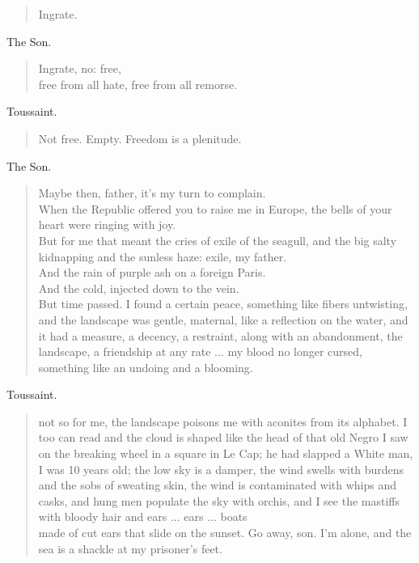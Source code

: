 \documentclass[letterpaper,article,12pt,oneside,notitlepage]{memoir}
\begin{document}
\begin{verse}
Ingrate. \\
\end{verse}

\begin{center}The Son.\end{center}

\begin{verse}
Ingrate, no: free, \\
free from all hate, free from all remorse. \\
\end{verse}

\begin{center}Toussaint.\end{center}

\begin{verse}
Not free. Empty. Freedom is a plenitude. \\
\end{verse}

\begin{center}The Son.\end{center}

\begin{verse}
Maybe then, father, it's my turn to complain. \\
When the Republic offered you to raise me in Europe, the bells of your heart were ringing with joy.  \\
But for me that meant the cries of exile of the seagull, and the big salty kidnapping and the sunless haze: exile, my father.  \\
And the rain of purple ash on a foreign Paris. \\
And the cold, injected down to the vein. \\
But time passed. I found a certain peace, something like fibers untwisting, and the landscape was gentle, maternal, like a reflection on the water, and it had a measure, a decency, a restraint, along with an abandonment, the landscape, a friendship at any rate ... my blood no longer cursed, something like an undoing and a blooming.  \\
\end{verse}

\begin{center}Toussaint.\end{center}

\begin{verse}
not so for me, the landscape poisons me with aconites from its alphabet. I too can read and the cloud is shaped like the head of that old Negro I saw on the breaking wheel in a square in Le Cap; he had slapped a White man, I was 10 years old; the low sky is a damper, the wind swells with burdens and the sobs of sweating skin, the wind is contaminated with whips and casks, and hung men populate the sky with orchis, and I see the mastiffs with bloody hair and ears ... ears ... boats  \\
made of cut ears that slide on the sunset. Go away, son. I'm alone, and the sea is a shackle at my prisoner's feet.  \\
\end{verse}
\end{document}
